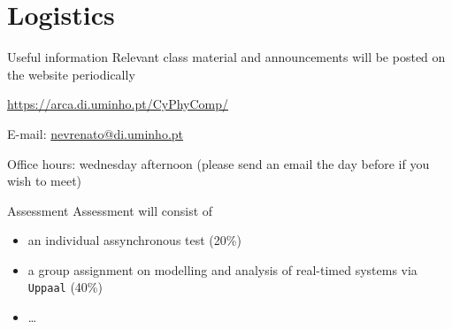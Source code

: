 \documentclass{beamer}
\begin{document}
\section{Logistics}

\begin{frame}{Useful information}
  Relevant class material and announcements will be posted on the website periodically

  \url{https://arca.di.uminho.pt/CyPhyComp/}


  E-mail: \href{mailto:nevrenato@di.uminho.pt}{nevrenato@di.uminho.pt}

  Office hours: wednesday afternoon (please send an email the day before if you wish to meet)
\end{frame}

\begin{frame}{Assessment}
  Assessment will consist of
  \begin{itemize}
  \item an individual \alert{assynchronous} test (20\%)
  \item a group assignment on modelling and analysis of real-timed systems via \texttt{Uppaal} (40\%)
  \item \dots
  \end{itemize}
\end{frame}
\end{document}
